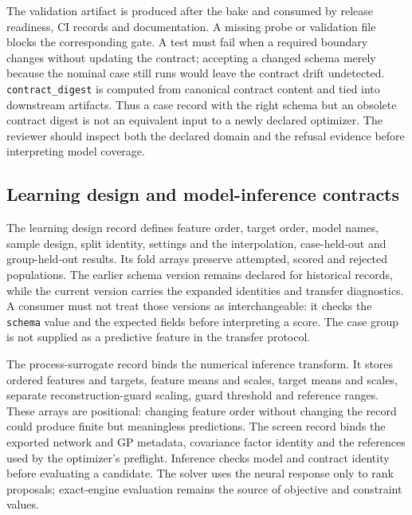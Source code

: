 \documentclass[10pt]{article}
\begin{document}
The validation artifact is produced after the bake and consumed by
release readiness, CI records and documentation. A missing probe or
validation file blocks the corresponding gate. A test must fail when a
required boundary changes without updating the contract; accepting a
changed schema merely because the nominal case still runs would leave
the contract drift undetected. \texttt{contract\_digest} is computed
from canonical contract content and tied into downstream artifacts. Thus
a case record with the right schema but an obsolete contract digest is
not an equivalent input to a newly declared optimizer. The reviewer
should inspect both the declared domain and the refusal evidence before
interpreting model coverage.

\subsection{Learning design and model-inference
contracts}\label{learning-design-and-model-inference-contracts}

\label{contract-learning-artifacts}

The learning design record defines feature order, target order, model
names, sample design, split identity, settings and the interpolation,
case-held-out and group-held-out results. Its fold arrays preserve
attempted, scored and rejected populations. The earlier schema version
remains declared for historical records, while the current version
carries the expanded identities and transfer diagnostics. A consumer
must not treat those versions as interchangeable: it checks the
\texttt{schema} value and the expected fields before interpreting a
score. The case group is not supplied as a predictive feature in the
transfer protocol.

The process-surrogate record binds the numerical inference transform. It
stores ordered features and targets, feature means and scales, target
means and scales, separate reconstruction-guard scaling, guard threshold
and reference ranges. These arrays are positional: changing feature
order without changing the record could produce finite but meaningless
predictions. The screen record binds the exported network and GP
metadata, covariance factor identity and the references used by the
optimizer's preflight. Inference checks model and contract identity
before evaluating a candidate. The solver uses the neural response only
to rank proposals; exact-engine evaluation remains the source of
objective and constraint values.
\end{document}
